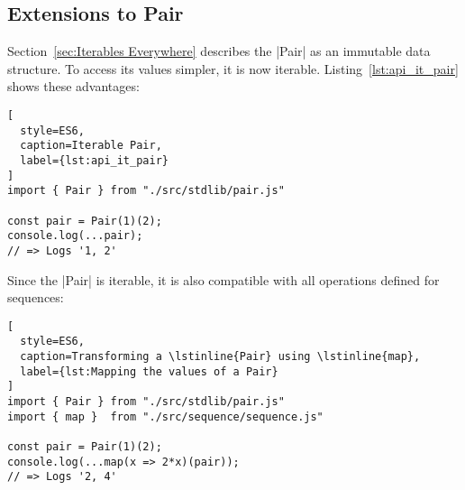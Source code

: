 \subsection{Extensions to Pair} %
\label{sub:Extensions to Pair}
Section~\ref{sec:Iterables Everywhere} describes the |Pair| as an immutable
data structure. To access its values simpler, it is now iterable.
Listing~\ref{lst:api_it_pair} shows these advantages:

\begin{lstlisting}[
  style=ES6,
  caption=Iterable Pair,
  label={lst:api_it_pair}
]
import { Pair } from "./src/stdlib/pair.js"

const pair = Pair(1)(2);
console.log(...pair);
// => Logs '1, 2'
\end{lstlisting}

Since the |Pair| is iterable, it is also compatible with all operations defined
for sequences:

\begin{lstlisting}[
  style=ES6,
  caption=Transforming a \lstinline{Pair} using \lstinline{map},
  label={lst:Mapping the values of a Pair}
]
import { Pair } from "./src/stdlib/pair.js"
import { map }  from "./src/sequence/sequence.js"

const pair = Pair(1)(2);
console.log(...map(x => 2*x)(pair));
// => Logs '2, 4'
\end{lstlisting}


